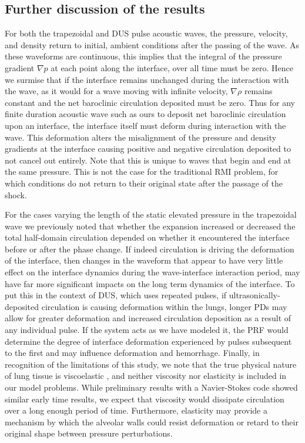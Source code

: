 \subsection{Further discussion of the results}%
\label{subsec:usbe_lung_further_discussion}%
For both the trapezoidal and \ac{DUS} pulse acoustic waves, the
pressure, velocity, and density return to initial, ambient conditions
after the passing of the wave. As these waveforms are continuous, this
implies that the integral of the pressure gradient $\nabla p$ at each
point along the interface, over all time must be zero. Hence we
surmise that if the interface remains unchanged during the interaction
with the wave, as it would for a wave moving with infinite velocity,
$\nabla \rho$ remains constant and the net baroclinic circulation
deposited must be zero. Thus for any finite duration acoustic wave
such as ours to deposit net baroclinic circulation upon an interface,
the interface itself must deform during interaction with the
wave. This deformation alters the misalignment of the pressure and
density gradients at the interface causing positive and negative
circulation deposited to not cancel out entirely. Note that this is
unique to waves that begin and end at the same pressure. This is not
the case for the traditional \ac{RMI} problem, for which conditions do
not return to their original state after the passage of the shock.

For the cases varying the length of the static elevated pressure in
the trapezoidal wave we previously noted that whether the expansion
increased or decreased the total half-domain circulation depended on
whether it encountered the interface before or after the phase
change. If indeed circulation is driving the deformation of the
interface, then changes in the waveform that appear to have very
little effect on the interface dynamics during the wave-interface
interaction period, may have far more significant impacts on the long
term dynamics of the interface. To put this in the context of
\ac{DUS}, which uses repeated pulses, if ultrasonically-deposited
circulation is causing deformation within the lungs, longer \acp{PD}
may allow for greater deformation and increased circulation deposition
as a result of any individual pulse. If the system acts as we have
modeled it, the \ac{PRF} would determine the degree of interface
deformation experienced by pulses subsequent to the first and may
influence deformation and hemorrhage. Finally, in recognition of the
limitations of this study, we note that the true physical nature of
lung tissue is viscoelastic \citep{Bayliss1939}, and neither viscosity
nor elasticity is included in our model problems. While preliminary
results with a Navier-Stokes code showed similar early time results,
we expect that viscosity would dissipate circulation over a long
enough period of time. Furthermore, elasticity may provide a mechanism
by which the alveolar walls could resist deformation or retard to
their original shape between pressure perturbations.

